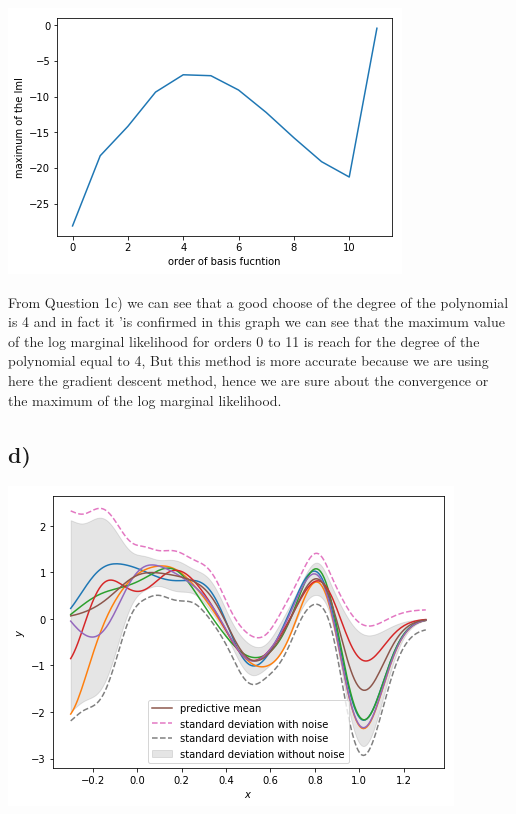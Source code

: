 \documentclass[12pt,twoside]{article}
\begin{document}
\begin{center}
	\includegraphics{../3c.png}	     
\end{center}

From Question 1c) we can see that a good choose of the degree of the polynomial is 4 and in fact it 'is confirmed in this graph we can see that the maximum value of the log marginal likelihood for orders 0 to 11 is reach for the degree of the polynomial equal to 4, But this method is more accurate because we are using here the gradient descent method, hence we are sure about the convergence or the maximum of the log marginal likelihood.

\subsection*{d)}
\begin{center}
	\includegraphics{../3d.png}	     
\end{center}
\end{document}
